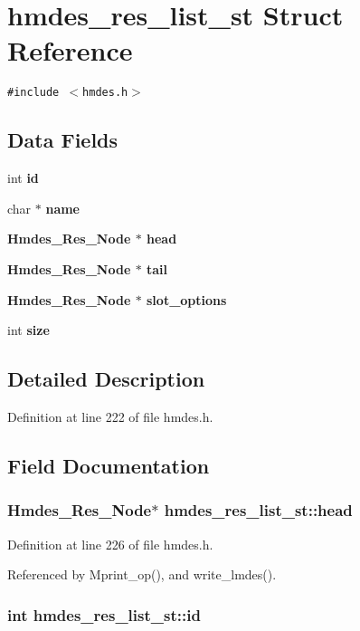 \section{hmdes\_\-res\_\-list\_\-st Struct Reference}
\label{structhmdes__res__list__st}
{\tt \#include $<$hmdes.h$>$}

\subsection*{Data Fields}
\begin{CompactItemize}
\item 
int \bf{id}
\item 
char $\ast$ \bf{name}
\item 
\bf{Hmdes\_\-Res\_\-Node} $\ast$ \bf{head}
\item 
\bf{Hmdes\_\-Res\_\-Node} $\ast$ \bf{tail}
\item 
\bf{Hmdes\_\-Res\_\-Node} $\ast$ \bf{slot\_\-options}
\item 
int \bf{size}
\end{CompactItemize}


\subsection{Detailed Description}




Definition at line 222 of file hmdes.h.

\subsection{Field Documentation}
\subsubsection{\setlength{\rightskip}{0pt plus 5cm}\bf{Hmdes\_\-Res\_\-Node}$\ast$ \bf{hmdes\_\-res\_\-list\_\-st::head}}\label{structhmdes__res__list__st_2d1075e173a779cec43a71c6eae14b24}




Definition at line 226 of file hmdes.h.

Referenced by Mprint\_\-op(), and write\_\-lmdes().
\subsubsection{\setlength{\rightskip}{0pt plus 5cm}int \bf{hmdes\_\-res\_\-list\_\-st::id}}\label{structhmdes__res__list__st_b15e964410d220e9bf1010c1647383f1}




